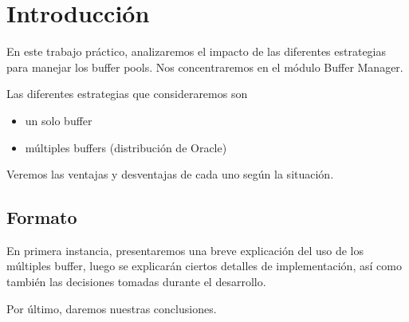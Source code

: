 \section{Introducci\'on}

En este trabajo pr\'actico, analizaremos el impacto de las diferentes
estrategias para manejar los buffer pools.
Nos concentraremos en el m\'odulo Buffer Manager.

\vspace*{0.3cm}

Las diferentes estrategias que consideraremos son

\begin{itemize}
    \item
            un solo buffer
    \item
            múltiples buffers (distribución de Oracle)    
\end{itemize}

\vspace*{0.3cm}

Veremos las ventajas y desventajas de cada uno seg\'un la situaci\'on.

\subsection{Formato}

\vspace*{0.3cm}

En primera instancia, presentaremos una breve explicación
del uso de los múltiples buffer, luego se explicar\'an ciertos 
detalles de implementaci\'on, as\'i como tambi\'en las decisiones 
tomadas durante el desarrollo.

\vspace*{0.3cm}

Por \'ultimo, daremos nuestras conclusiones.

